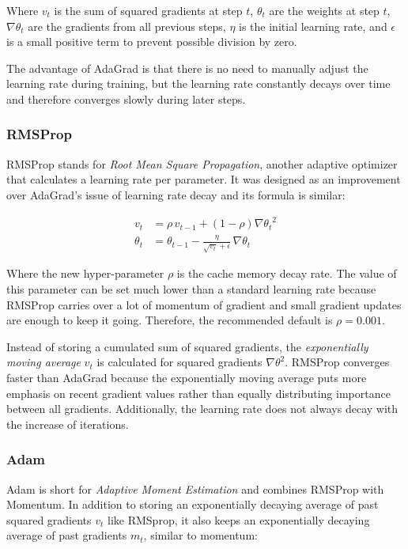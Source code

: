 \documentclass[a4paper]{report}
\begin{document}
Where $v_t$ is the sum of squared gradients at step $t$, $\theta_t$ are the weights at step $t$, $\nabla\theta_t$ are the gradients from all previous steps, $\eta$ is the initial learning rate, and $\epsilon$ is a small positive term to prevent possible division by zero.

The advantage of AdaGrad is that there is no need to manually adjust the learning rate during training, but the learning rate constantly decays over time and therefore converges slowly during later steps.

\subsubsection*{RMSProp}
RMSProp stands for \emph{Root Mean Square Propagation}, another adaptive optimizer that calculates a learning rate per parameter. It was designed as an improvement over AdaGrad's issue of learning rate decay and its formula is similar:

\begin{align*}
    v_t &= \rho \, v_{t-1} + (1-\rho) {\nabla\theta_t}^2 \\
    \theta_t &= \theta_{t-1} - \frac{\eta}{\sqrt{v_t} + \epsilon} \, \nabla\theta_t
\end{align*}

Where the new hyper-parameter $\rho$ is the cache memory decay rate. The value of this parameter can be set much lower than a standard learning rate because RMSProp carries over a lot of momentum of gradient and small gradient updates are enough to keep it going. Therefore, the recommended default is $\rho = 0.001$.


Instead of storing a cumulated sum of squared gradients, the \emph{exponentially moving average} $v_t$ is calculated for squared gradients ${\nabla\theta}^2$. RMSProp converges faster than AdaGrad because the exponentially moving average puts more emphasis on recent gradient values rather than equally distributing importance between all gradients. Additionally, the learning rate does not always decay with the increase of iterations. 

\subsubsection*{Adam}
Adam is short for \emph{Adaptive Moment Estimation} and combines RMSProp with Momentum. In addition to storing an exponentially decaying average of past squared gradients $v_t$ like RMSprop, it also keeps an exponentially decaying average of past gradients $m_t$, similar to momentum:
\end{document}
